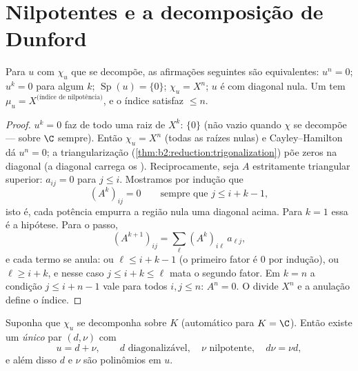 \section{Nilpotentes e a decomposição de Dunford}

\begin{proposition}\label{prop:b2:reduction:nilpotent}
Para $u$ com $\chi_u$ que se decompõe, as afirmações seguintes são equivalentes: $u^n =
0$; $u^k = 0$ para algum $k$; $\operatorname{Sp}(u) = \{0\}$; $\chi_u
= X^n$; $u$ é  com diagonal nula. Um  tem $\mu_u = X^{\text{(índice de nilpotência)}}$, e o índice satisfaz
$\leq n$.
\end{proposition}

\begin{proof}
$u^k = 0$ faz de todo  uma raiz de $X^k$:  $\{0\}$
(não vazio quando $\chi$ se decompõe --- sobre $\C$ sempre). Então $\chi_u =
X^n$ (todas as raízes nulas) e Cayley--Hamilton dá $u^n = 0$;
a triangularização (\cref{thm:b2:reduction:trigonalization}) põe
zeros na diagonal (a diagonal carrega os ).
Reciprocamente, seja $A$ estritamente triangular superior: $a_{ij} = 0$
para $j \leq i$. Mostramos por indução que
\[
(A^k)_{ij} = 0 \qquad \text{sempre que } j \leq i + k - 1,
\]
isto é, cada potência empurra a região nula uma diagonal acima. Para
$k = 1$ essa é a hipótese. Para o passo,
\[
(A^{k+1})_{ij} = \sum_{\ell} (A^k)_{i\ell}\,a_{\ell j} ,
\]
e cada termo se anula: ou $\ell \leq i + k - 1$ (o primeiro
fator é $0$ por indução), ou $\ell \geq i + k$, e nesse caso
$j \leq i + k \leq \ell$ mata o segundo fator. Em $k = n$ a
condição $j \leq i + n - 1$ vale para todos $i, j \leq n$: $A^n =
0$. O  divide $X^n$ e a anulação
define o índice.
\end{proof}

\begin{theorem}\label{thm:b2:reduction:dunford}
Suponha que $\chi_u$ se decomponha sobre $K$ (automático para $K = \C$). Então
existe um \emph{único} par $(d, \nu)$ com
\[
u = d + \nu, \qquad d \text{ diagonalizável}, \quad \nu
\text{ nilpotente}, \quad d\nu = \nu d ,
\]
e além disso $d$ e $\nu$ são polinômios em
$u$.
\end{theorem}

